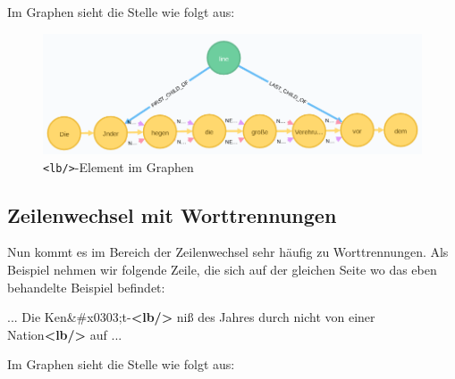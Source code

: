 \documentclass[ngerman,]{scrreprt}
\newenvironment{Shaded}{}{}
\newcommand{\KeywordTok}[1]{\textcolor[rgb]{0.00,0.44,0.13}{\textbf{#1}}}
\newcommand{\DecValTok}[1]{\textcolor[rgb]{0.25,0.63,0.44}{#1}}
\newcommand{\NormalTok}[1]{#1}
\begin{document}
Im Graphen sieht die Stelle wie folgt aus:

\begin{figure}
\centering
\includegraphics{Bilder/TEI2Graph/lb-to-line.png}
\caption{\texttt{\textless{}lb/\textgreater{}}-Element im Graphen}
\end{figure}

\subsection{Zeilenwechsel mit Worttrennungen}\label{zeilenwechsel-mit-worttrennungen}

Nun kommt es im Bereich der Zeilenwechsel sehr häufig zu Worttrennungen. Als Beispiel nehmen wir folgende Zeile, die sich auf der gleichen Seite wo das eben behandelte Beispiel befindet:

\begin{Shaded}
\begin{Highlighting}[]
\NormalTok{... Die Ken}\DecValTok{&#x0303;}\NormalTok{t-}\KeywordTok{<lb/>}
\NormalTok{niß des Jahres durch nicht von einer Nation}\KeywordTok{<lb/>}
\NormalTok{auf ...}
\end{Highlighting}
\end{Shaded}

Im Graphen sieht die Stelle wie folgt aus:
\end{document}
